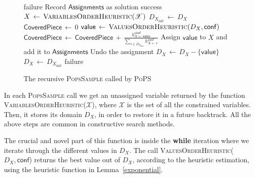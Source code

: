 \documentclass{ws-ijait}
\begin{document}
\begin{figure}
  \centering
  \begin{algorithmic}
        \State \Return failure
        \State Record $\mathsf{Assignments}$ as solution
        \State \Return success
      \EndIf
      \State $X \, \gets \,
              \Call{VariablesOrderHeuristic}{\mathscr{X}}$
      \State $D_{X_\mathrm{init}} \, \gets \, D_X$
      \State $\mathsf{CoveredPiece} \, \gets \, 0$
        \State $\mathsf{value} \, \gets \,
                \Call{ValuesOrderHeuristic}{D_X, \mathsf{conf}}$
        \State $\mathsf{CoveredPiece} \, \gets \,
                \mathsf{CoveredPiece} \, + \,
                \frac{h_{X \gets \mathsf{value}}^\mathsf{conf}}
                     {\sum_{v \in D_{X_\mathrm{init}}}
                      h_{X \gets v}^\mathsf{conf}}$
        \State Assign $\mathsf{value}$ to $X$ and add it to
               $\mathsf{Assignments}$
        \State {}
        \State Undo the assignment
        \State $D_X \, \gets \, D_X - \{\mathsf{value}\}$
      \EndWhile
      \State $D_X \, \gets \, D_{X_\mathrm{init}}$
      \State \Return failure
    \EndFunction
  \end{algorithmic}
  \caption{The recursive {\normalfont\textsc{PopsSample}}
           called by
           {\normalfont\textsc{PoPS}}\label{PopsSample}}
\end{figure}

In each \textsc{PopsSample} call we get an unassigned
variable returned by the function
\textsc{VariablesOrderHeuristic}($\mathscr{X}$), where
$\mathscr{X}$ is the set of all the constrained variables.
Then, it stores its domain $D_X$, in order to restore it in
a future backtrack. All the above steps are common in
constructive search methods.

The crucial and novel part of this function is inside the
\textbf{while} iteration where we iterate through the
different values in $D_X$. The call
\textsc{ValuesOrderHeuristic}($D_X, \mathsf{conf}$) returns
the best value out of $D_X$, according to the heuristic
estimation, using the heuristic function in
Lemma~\ref{exponential}.
\end{document}
